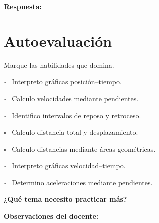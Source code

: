 \documentclass[11pt,letterpaper]{article}
\newcommand{\respuesta}{
 \par\vspace{0.3cm}
 \textcolor{morado}{\textbf{Respuesta:}}
 \hrulefill
 \par\vspace{0.3cm}
}
\newcommand{\espacio}[1]{
 \par\vspace{#1}
}
\newcommand{\casilla}{
 $\square$
}
\begin{document}
\espacio{7cm}
\respuesta

\newpage

\section*{Autoevaluación}

\begin{tcolorbox}[
 colback=celeste,
 colframe=azul,
 title={Revisión de mi aprendizaje}
]

Marque las habilidades que domina.

\vspace{0.3cm}

\casilla\ Interpreto gráficas
posición--tiempo.

\vspace{0.4cm}

\casilla\ Calculo velocidades
mediante pendientes.

\vspace{0.4cm}

\casilla\ Identifico intervalos
de reposo y retroceso.

\vspace{0.4cm}

\casilla\ Calculo distancia total
y desplazamiento.

\vspace{0.4cm}

\casilla\ Calculo distancias
mediante áreas geométricas.

\vspace{0.4cm}

\casilla\ Interpreto gráficas
velocidad--tiempo.

\vspace{0.4cm}

\casilla\ Determino aceleraciones
mediante pendientes.

\end{tcolorbox}

\vspace{0.5cm}

\textbf{¿Qué tema necesito practicar más?}

\espacio{2cm}
\hrulefill

\vspace{0.5cm}

\textbf{Observaciones del docente:}

\espacio{2cm}
\hrulefill
\end{document}

